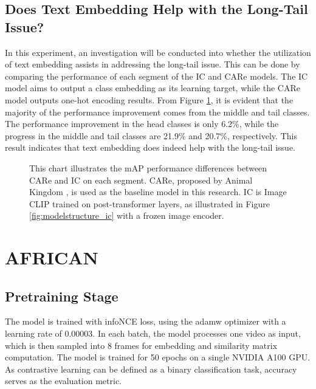 \subsection{Does Text Embedding Help with the Long-Tail Issue?}
In this experiment, an investigation will be conducted into whether the utilization of text embedding assists in addressing the long-tail issue. This can be done by comparing the performance of each segment of the IC and CARe models. The IC model aims to output a class embedding as its learning target, while the CARe model outputs one-hot encoding results. From Figure \ref{fig:tp_longtailcomp}, it is evident that the majority of the performance improvement comes from the middle and tail classes. The performance improvement in the head classes is only 6.2\%, while the progress in the middle and tail classes are 21.9\% and 20.7\%, respectively. This result indicates that text embedding does indeed help with the long-tail issue. 

\begin{figure}[ht]
    \centering
    \resizebox{1.0\textwidth}{!}{}
    \caption[mAP Performance Differences between CARe and IC on each Segment]{This chart illustrates the mAP performance differences between CARe and IC on each segment. CARe, proposed by Animal Kingdom \parencite{ng2022animal}, is used as the baseline model in this research. IC is Image CLIP trained on post-transformer layers, as illustrated in Figure \ref{fig:modelstructure_ic} with a frozen image encoder.}
    \label{fig:tp_longtailcomp}
\end{figure}



\section{AFRICAN}
\subsection{Pretraining Stage}
The model is trained with infoNCE \parencite{oord2019representation} loss, using the adamw optimizer with a learning rate of 0.00003. In each batch, the model processes one video as input, which is then sampled into 8 frames for embedding and similarity matrix computation. The model is trained for 50 epochs on a single NVIDIA A100 GPU. As contrastive learning can be defined as a binary classification task, accuracy serves as the evaluation metric.

